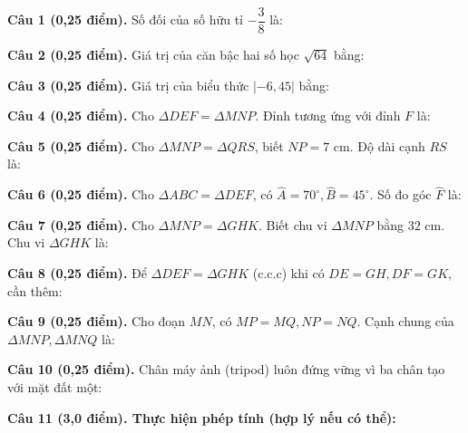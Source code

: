 \documentclass[12pt,a4paper]{article}
\begin{document}
\vspace{1.5mm}
\noindent\textbf{Câu 1 (0,25 điểm).} Số đối của số hữu tỉ $-\dfrac{3}{8}$ là: \par\vspace{2.3mm}
\noindent\textbf{Câu 2 (0,25 điểm).} Giá trị của căn bậc hai số học $\sqrt{64}$ bằng: \par\vspace{2.3mm}
\noindent\textbf{Câu 3 (0,25 điểm).} Giá trị của biểu thức $|-6{,}45|$ bằng: \par\vspace{2.3mm}
\noindent\textbf{Câu 4 (0,25 điểm).} Cho $\Delta DEF = \Delta MNP$. Đỉnh tương ứng với đỉnh $F$ là: \par\vspace{2.3mm}
\noindent\textbf{Câu 5 (0,25 điểm).} Cho $\Delta MNP = \Delta QRS$, biết $NP = 7\text{ cm}$. Độ dài cạnh $RS$ là: \par\vspace{2.3mm}
\noindent\textbf{Câu 6 (0,25 điểm).} Cho $\Delta ABC = \Delta DEF$, có $\widehat{A} = 70^\circ, \widehat{B} = 45^\circ$. Số đo góc $\widehat{F}$ là: \par\vspace{2.3mm}
\noindent\textbf{Câu 7 (0,25 điểm).} Cho $\Delta MNP = \Delta GHK$. Biết chu vi $\Delta MNP$ bằng $32\text{ cm}$. Chu vi $\Delta GHK$ là: \par\vspace{2.3mm}
\noindent\textbf{Câu 8 (0,25 điểm).} Để $\Delta DEF = \Delta GHK$ (c.c.c) khi có $DE=GH, DF=GK$, cần thêm: \par\vspace{2.3mm}
\noindent\textbf{Câu 9 (0,25 điểm).} Cho đoạn $MN$, có $MP = MQ, NP = NQ$. Cạnh chung của $\Delta MNP, \Delta MNQ$ là: \par\vspace{2.3mm}
\noindent\textbf{Câu 10 (0,25 điểm).} Chân máy ảnh (tripod) luôn đứng vững vì ba chân tạo với mặt đất một: \par\vspace{2.3mm}
\vspace{0.2mm}
\noindent\textbf{Câu 11 (3,0 điểm). Thực hiện phép tính (hợp lý nếu có thể):}
\vspace{0.8mm}
\end{document}

